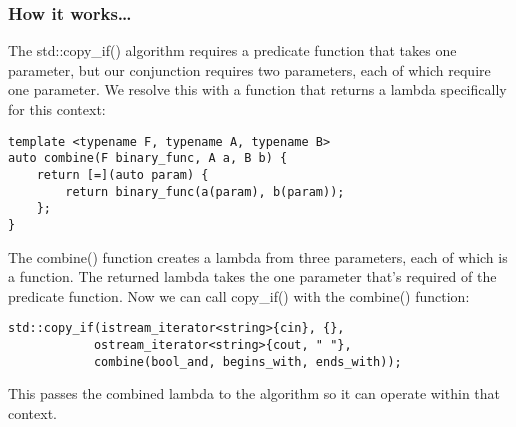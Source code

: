 \subsubsection{How it works…}

The std::copy\_if() algorithm requires a predicate function that takes one parameter, but our conjunction requires two parameters, each of which require one parameter. We resolve this with a function that returns a lambda specifically for this context:

\begin{lstlisting}[style=styleCXX]
template <typename F, typename A, typename B>
auto combine(F binary_func, A a, B b) {
	return [=](auto param) {
		return binary_func(a(param), b(param));
	};
}
\end{lstlisting}

The combine() function creates a lambda from three parameters, each of which is a function. The returned lambda takes the one parameter that's required of the predicate function. Now we can call copy\_if() with the combine() function:

\begin{lstlisting}[style=styleCXX]
std::copy_if(istream_iterator<string>{cin}, {},
			ostream_iterator<string>{cout, " "},
			combine(bool_and, begins_with, ends_with));
\end{lstlisting}

This passes the combined lambda to the algorithm so it can operate within that context.









